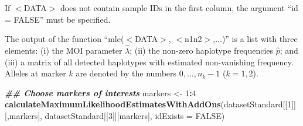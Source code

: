 \documentclass[
]{article}
\newenvironment{Shaded}{\begin{snugshade}}{\end{snugshade}}
\newcommand{\AttributeTok}[1]{\textcolor[rgb]{0.13,0.29,0.53}{#1}}
\newcommand{\ConstantTok}[1]{\textcolor[rgb]{0.56,0.35,0.01}{#1}}
\newcommand{\DecValTok}[1]{\textcolor[rgb]{0.00,0.00,0.81}{#1}}
\newcommand{\DocumentationTok}[1]{\textcolor[rgb]{0.56,0.35,0.01}{\textbf{\textit{#1}}}}
\newcommand{\FunctionTok}[1]{\textcolor[rgb]{0.13,0.29,0.53}{\textbf{#1}}}
\newcommand{\NormalTok}[1]{#1}
\newcommand{\OtherTok}[1]{\textcolor[rgb]{0.56,0.35,0.01}{#1}}
\newcommand{\SpecialCharTok}[1]{\textcolor[rgb]{0.81,0.36,0.00}{\textbf{#1}}}
\begin{document}
If \(<\)DATA\(>\) does not contain sample IDs in the first column, the
argument ``id = FALSE'' must be specified.

The output of the function ``mle(\(<\)DATA\(>\),
\(<\)n1n2\(>\),\(\ldots\))'' is a list with three elements: (i) the MOI
parameter \(\hat \lambda\); (ii) the non-zero haplotype frequencies
\(\hat p\); and (iii) a matrix of all detected haplotypes with estimated
non-vanishing frequency. Alleles at marker \(k\) are denoted by the
numbers \(0,\ldots,n_k-1\) (\(k=1,2\)).

\begin{Shaded}
\begin{Highlighting}[]
\DocumentationTok{\#\# Choose markers of interests}
\NormalTok{markers }\OtherTok{\textless{}{-}} \DecValTok{1}\SpecialCharTok{:}\DecValTok{4}
\FunctionTok{calculateMaximumLikelihoodEstimatesWithAddOns}\NormalTok{(datasetStandard[[}\DecValTok{1}\NormalTok{]][,markers], datasetStandard[[}\DecValTok{3}\NormalTok{]][markers], }\AttributeTok{idExists =} \ConstantTok{FALSE}\NormalTok{)}
\end{Highlighting}
\end{Shaded}
\end{document}
